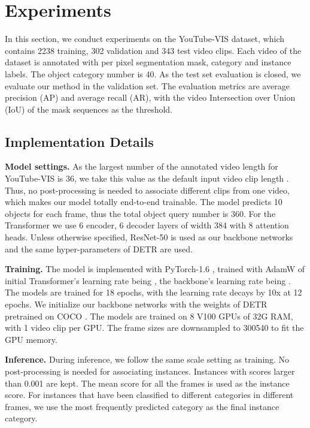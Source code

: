 \documentclass[final]{cvpr}
\newcommand{\myparagraph}[1]{{\vspace{0.01cm} \noindent \bf #1}}
\begin{document}
{\section{Experiments}

In this section, we conduct experiments on the YouTube-VIS \cite{vis2019} dataset, which contains 2238 training, 302 validation and 343 test video clips. Each video of the dataset is annotated with per pixel segmentation mask, category and instance labels. The object category number is 40. As the test set evaluation is closed, we evaluate our method in the validation set. The evaluation metrics are average precision (AP) and average recall (AR), with the video Intersection over Union (IoU) of the mask sequences as the threshold.




\subsection{Implementation Details}
\myparagraph{Model settings.} 
As the largest number of the annotated video length for YouTube-VIS \cite{vis2019} is 36, we take this value as the default input video clip length .
Thus, no post-processing is needed to associate different clips from one video, which makes our model totally end-to-end trainable. The model predicts 10 objects for each frame, thus the total object query number is 360. For the Transformer we use 6 encoder, 6 decoder layers of width 384 with 8 attention heads. Unless otherwise specified, ResNet-50 \cite{he2016deep} is used as our backbone networks and the same hyper-parameters of 
DETR \cite{Detr} are used.


\myparagraph{Training.} The model is implemented with PyTorch-1.6 \cite{paszke2019pytorch}, trained with AdamW \cite{loshchilov2018decoupled} of initial Transformer’s learning rate being  , the backbone’s learning rate being . The models are trained for 18 epochs, with the learning rate decays by 10x at 12 epochs. We initialize our backbone networks with the weights of DETR pretrained on COCO \cite{lin2014microsoft}. The models are trained on 8  V100 GPUs of 32G RAM, with 1 video clip per GPU. The frame sizes are downsampled to 300540 to fit the GPU memory.  


\myparagraph{Inference.} During inference, we follow the same scale setting as training. No post-processing is needed for associating instances. Instances with scores larger than 0.001 are kept. The mean score for all the frames is used as the instance score. For instances that have been classified to different categories in different frames, we use the most frequently predicted category as the final instance category. 



}
\end{document}
